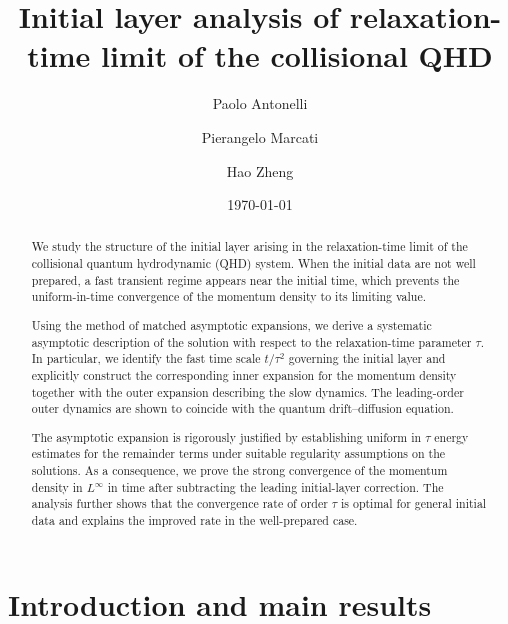 \documentclass[english]{amsart}
\date\today
\title{Initial layer analysis of relaxation-time limit of the collisional QHD}
\author[P. Antonelli]{Paolo Antonelli}
\author[P. Marcati]{Pierangelo Marcati}
\author[H. Zheng]{Hao Zheng}
\theoremstyle{plain}
\theoremstyle{definition}
\theoremstyle{remark}
\theoremstyle{plain}
\theoremstyle{plain}
\theoremstyle{plain}
\numberwithin{equation}{section}
\begin{document}
\maketitle

\begin{abstract}
We study the structure of the initial layer arising in the relaxation-time limit of the collisional quantum hydrodynamic (QHD) system. When the initial data are not well prepared, a fast transient regime appears near the initial time, which prevents the uniform-in-time convergence of the momentum density to its limiting value.

Using the method of matched asymptotic expansions, we derive a systematic asymptotic description of the solution with respect to the relaxation-time parameter $\tau$. In particular, we identify the fast time scale $t/\tau^{2}$ governing the initial layer and explicitly construct the corresponding inner expansion for the momentum density together with the outer expansion describing the slow dynamics. The leading-order outer dynamics are shown to coincide with the quantum drift–diffusion equation.

The asymptotic expansion is rigorously justified by establishing uniform in $\tau$ energy estimates for the remainder terms under suitable regularity assumptions on the solutions. As a consequence, we prove the strong convergence of the momentum density in $L^\infty$ in time after subtracting the leading initial-layer correction. The analysis further shows that the convergence rate of order $\tau$ is optimal for general initial data and explains the improved rate in the well-prepared case.
\end{abstract}

\section{Introduction and main results}
\end{document}
